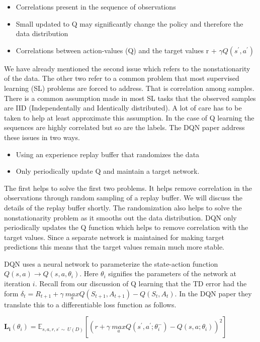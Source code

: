\begin{itemize}
    \item Correlations present in the sequence of observations
    \item Small updated to Q may significantly change the policy and therefore the data distribution
    \item Correlations between action-values (Q) and the target values r + $\gamma Q(s^{'},a^{'})$
\end{itemize}

We have already mentioned the second issue which refers to the nonstationarity of the data. The other two refer to a common problem that most supervised learning (SL) problems are forced to address. That is correlation among samples. There is a common assumption made in most SL tasks that the observed samples are IID (Independentally and Identically distributed). A lot of care has to be taken to help at least approximate this assumption.  In the case of Q learning the sequences are highly correlated but so are the labels. The DQN paper address these issues in two ways. 

\begin{itemize}
    \item Using an experience replay buffer that randomizes the data
    \item Only periodically update Q and maintain a target network. 
\end{itemize}

The first helps to solve the first two problems. It helps remove correlation in the observations through random sampling of a replay buffer. We will discuss the details of the replay buffer shortly. The randomization also helps to solve the nonstationarity problem as it smooths out the data distribution. DQN only periodically updates the Q function which helps to remove correlation with the target values. Since a separate network is maintained for making target predictions this means that the target values remain much more stable. 

DQN uses a neural network to parameterize the state-action function $Q(s,a) \rightarrow Q(s,a,\theta_{i})$. Here $\theta_{i}$ signifies the parameters of the network at iteration $i$. Recall from our discussion of Q learning that the TD error had the form $\delta_{t} = R_{t + 1} + \gamma \: \underset{a}{max} Q(S_{t + 1},A_{t + 1}) - Q(S_{t},A_{t})$. In the DQN paper they translate this to a differentiable loss function as follows. 

$ \mathbf{L_{i}}(\theta_{i}) = \mathbb{E}_{s,a,r,s^{'} \sim \: U(D)} [(r + \gamma \: \underset{a}{max} Q(s^{'},a^{'};\theta_{i}^{-}) - Q(s,a;\theta_{i}))^{2}]$

